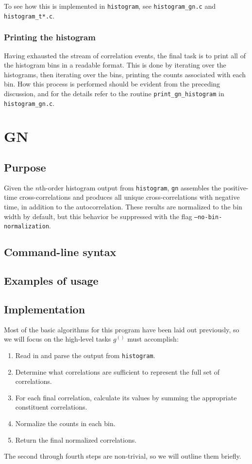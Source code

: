 \documentclass{article}
\newcommand{\histogram}{\texttt{histogram}}
\newcommand{\gn}[1]{\ensuremath{g^{(#1)}}}
\newcommand{\GN}{\texttt{gn}}
\begin{document}
To see how this is implemented in \histogram, see \texttt{histogram\_gn.c} and \texttt{histogram\_t*.c}.

\subsubsection{Printing the histogram}
Having exhausted the stream of correlation events, the final task is to print all of the histogram bins in a readable format. This is done by iterating over the histograms, then iterating over the bins, printing the counts associated with each bin. How this process is performed should be evident from the preceding discussion, and for the details refer to the routine \texttt{print\_gn\_histogram} in \texttt{histogram\_gn.c}.

\section{GN}
\subsection{Purpose}
Given the $n$th-order histogram output from \histogram, \GN{} assembles the positive-time cross-correlations and produces all unique cross-correlations with negative time, in addition to the autocorrelation. These results are normalized to the bin width by default, but this behavior be suppressed with the flag \texttt{--no-bin-normalization}.

\subsection{Command-line syntax}

\subsection{Examples of usage}

\subsection{Implementation}
Most of the basic algorithms for this program have been laid out previously, so we will focus on the high-level tasks \gn{} must accomplish:
\begin{enumerate}
\item Read in and parse the output from \histogram.
\item Determine what correlations are sufficient to represent the full set of correlations.
\item For each final correlation, calculate its values by summing the appropriate constituent correlations.
\item Normalize the counts in each bin.
\item Return the final normalized correlations.
\end{enumerate}
The second through fourth steps are non-trivial, so we will outline them briefly.
\end{document}
